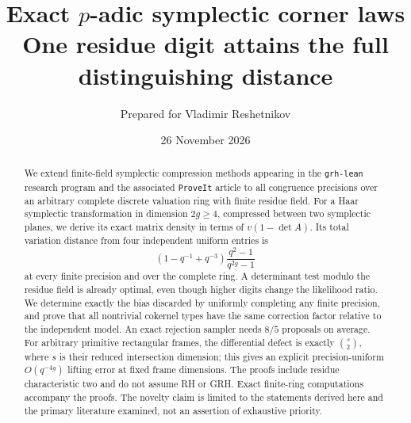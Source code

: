 \documentclass[11pt,letterpaper]{article}
\title{\textbf{Exact $p$-adic symplectic corner laws}\\[5pt]
\large One residue digit attains the full distinguishing distance}
\author{Prepared for Vladimir Reshetnikov}
\date{26 November 2026}
\theoremstyle{remark}
\begin{document}
\maketitle
\begin{abstract}
We extend finite-field symplectic compression methods appearing in the
\texttt{grh-lean} research program and the associated \texttt{ProveIt} article
to all congruence precisions over an arbitrary complete discrete valuation
ring with finite residue field. For a Haar symplectic transformation in
dimension $2g\ge4$, compressed between two symplectic planes, we derive its
exact matrix density in terms of $v(1-\det A)$. Its total variation distance
from four independent uniform entries is
\[
 \left(1-q^{-1}+q^{-3}\right)\frac{q^2-1}{q^{2g}-1}
\]
at every finite precision and over the complete ring. A determinant test
modulo the residue field is already optimal, even though higher digits
change the likelihood ratio. We determine exactly the bias discarded by
uniformly completing any finite precision, and prove that all nontrivial
cokernel types have the same correction factor relative to the independent
model. An exact rejection sampler needs $8/5$ proposals on average.
For arbitrary primitive rectangular frames, the differential defect is
exactly $\binom{s}{2}$, where $s$ is their reduced intersection dimension;
this gives an explicit precision-uniform $O(q^{-4g})$ lifting error at
fixed frame dimensions. The proofs include residue characteristic two
and do not assume RH or GRH. Exact finite-ring computations accompany
the proofs. The novelty claim is limited to the statements derived here
and the primary literature examined, not an assertion of exhaustive priority.
\end{abstract}
\setcounter{tocdepth}{1}
\tableofcontents
\newpage







\end{document}
